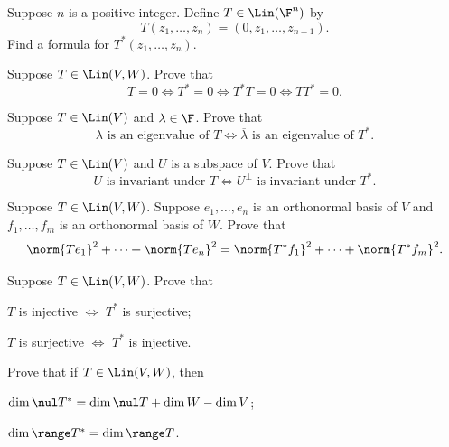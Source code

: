 
\begin{exercise}
Suppose $n$ is a positive integer. Define $T\in\Lin(\F^n)$ by
\[ T(z_1,\dots,z_n) = (0,z_1,\dots,z_{n-1}). \]
Find a formula for $T^*(z_1,\dots,z_n)$.
\end{exercise}

\begin{exercise}
Suppose $T\in\Lin(V,W)$. Prove that
\[ T=0 \iff T^*=0 \iff T^*T=0 \iff TT^*=0. \]
\end{exercise}

\begin{exercise}
Suppose $T\in\Lin(V)$ and $\lambda\in\F$. Prove that
\[ \lambda \text{ is an eigenvalue of } T \iff \overline{\lambda} \text{ is an
   eigenvalue of } T^*. \]
\end{exercise}

\begin{exercise}
Suppose $T\in\Lin(V)$ and $U$ is a subspace of $V$. Prove that
\[ U \text{ is invariant under } T \iff U^\perp \text{ is invariant under }
   T^*. \]
\end{exercise}

\begin{exercise}
Suppose $T\in\Lin(V,W)$. Suppose $e_1,\dots,e_n$ is an orthonormal basis of $V$
and $f_1,\dots,f_m$ is an orthonormal basis of $W$. Prove that
\[ \norm{Te_1}^2+\cdots+\norm{Te_n}^2 = \norm{T^*f_1}^2+\cdots+\norm{T^*f_m}^2. \]
\end{exercise}

\begin{exercise}
Suppose $T\in\Lin(V,W)$. Prove that
\begin{parts}
\item $T$ is injective $\iff$ $T^*$ is surjective;
\item $T$ is surjective $\iff$ $T^*$ is injective.
\end{parts}
\end{exercise}

\begin{exercise}
Prove that if $T\in\Lin(V,W)$, then
\begin{parts}
\item $\dim\nul T^*=\dim\nul T+\dim W-\dim V$;
\item $\dim\range T^*=\dim\range T$.
\end{parts}
\end{exercise}

